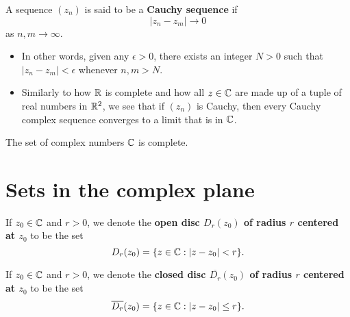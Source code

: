 \documentclass[11pt,a4paper]{book}
\begin{document}
\begin{definition}
    A sequence \( ({z}_{n})  \) is said to be a \textbf{Cauchy sequence} if 
    \[  | {z}_{n} - {z}_{m} |  \to 0  \]
    as \( n,m \to \infty  \).
\end{definition}

\begin{itemize}
    \item In other words, given any \( \epsilon > 0  \), there exists an integer \( N > 0  \) such that \( | {z}_{n} - {z}_{m} | < \epsilon  \) whenever \( n,m > N  \).
    \item Similarly to how \( \mathbb{R}  \) is complete and how all \( z \in \mathbb{C}   \) are made up of a tuple of real numbers in \( \mathbb{R}^{2} \), we see that if \( ({z}_{n}) \) is Cauchy, then every Cauchy complex sequence converges to a limit that is in \( \mathbb{C}  \).
\end{itemize}

\begin{theorem}[ ]
    The set of complex numbers \( \mathbb{C}  \) is complete.
\end{theorem}

\section{Sets in the complex plane}

\begin{definition}
    If \( {z}_{0} \in \mathbb{C}  \) and \( r > 0  \), we denote the \textbf{open disc \( {D}_{r}({z}_{0}) \) of radius \( r  \) centered at \( {z}_{0} \)} to be the set  
    \[  {D}_{r}({z}_{0}) = \{ z \in \mathbb{C} : | z - {z}_{0} | < r \}. \]
\end{definition}

\begin{definition}
    If \( {z}_{0} \in \mathbb{C}  \) and \( r > 0  \), we denote the \textbf{closed disc \( \overline{{D}_{r}}({z}_{0})  \) of radius \( r  \) centered at \( {z}_{0} \)} to be the set 
    \[ \overline{{D}_{r}}({z}_{0}) = \{ z \in \mathbb{C} : | z - {z}_{0} |  \leq r  \}.    \]
\end{definition}
\end{document}
